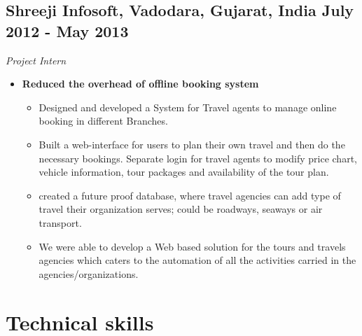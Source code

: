 \documentclass[11pt,letterpaper,sans]{moderncv}        %
\begin{document}
\vspace{5pt}

\subsection{\textbf{Shreeji Infosoft}, Vadodara, Gujarat, India \small{July 2012 - May 2013}}
\textit{Project Intern}
\begin {small}
\begin{itemize}

\item \textbf{Reduced the overhead of offline booking system}
\begin{itemize}
\item Designed and developed a System for Travel agents to manage online booking in different Branches.
\vspace{1pt}
\item Built a web-interface for users to plan their own travel and then do the necessary bookings. Separate login for travel agents to modify price chart, vehicle information, tour packages and availability of the tour plan.
\vspace{1pt}
\item created a future proof database, where travel agencies can add type of travel their organization serves; could be roadways, seaways or air transport.
\vspace{1pt}
\item We were able to develop a Web based solution for the tours and travels agencies which caters to the automation of all the activities carried in the agencies/organizations.
\end{itemize}

\end{itemize}
\end{small}


\section{Technical skills}

\vspace{2pt}
\end{document}
